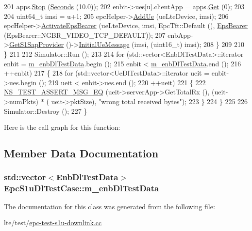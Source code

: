 \begin{DoxyCode}
201           apps.\hyperlink{classns3_1_1ApplicationContainer_adfc52f9aa4020c8714679b00bbb9ddb3}{Stop} (\hyperlink{group__timecivil_ga33c34b816f8ff6628e33d5c8e9713b9e}{Seconds} (10.0));   
202           enbit->ues[u].clientApp = apps.\hyperlink{classns3_1_1ApplicationContainer_a9e565807abd4213a56566a7ccd8d7509}{Get} (0);
203 
204           uint64\_t imsi = u+1;
205           epcHelper->\hyperlink{classns3_1_1PointToPointEpcHelper_a6ed801de21387477fabd23eeafff7e73}{AddUe} (ueLteDevice, imsi);
206           epcHelper->\hyperlink{classns3_1_1PointToPointEpcHelper_a97023077eae8644e8f1b269a357c8f93}{ActivateEpsBearer} (ueLteDevice, imsi, EpcTft::Default (), 
      \hyperlink{structns3_1_1EpsBearer}{EpsBearer} (EpsBearer::NGBR\_VIDEO\_TCP\_DEFAULT));
207           enbApp->\hyperlink{classns3_1_1EpcEnbApplication_a706b531d6ec3ab6eb37567232f5c6cd4}{GetS1SapProvider} ()->\hyperlink{classns3_1_1EpcEnbS1SapProvider_af5e1397f498eb5b2b2e84d8a41106cac}{InitialUeMessage} (imsi, (uint16\_t) 
      imsi);
208         \} 
209             
210     \} 
211   
212   Simulator::Run ();
213 
214   \textcolor{keywordflow}{for} (std::vector<EnbDlTestData>::iterator enbit = \hyperlink{classEpcS1uDlTestCase_a076410c7636f6081aeaab215a0a1bf9d}{m\_enbDlTestData}.begin ();
215        enbit < \hyperlink{classEpcS1uDlTestCase_a076410c7636f6081aeaab215a0a1bf9d}{m\_enbDlTestData}.end ();
216        ++enbit)
217     \{
218       \textcolor{keywordflow}{for} (std::vector<UeDlTestData>::iterator ueit = enbit->ues.begin ();
219            ueit < enbit->ues.end ();
220            ++ueit)
221         \{
222           \hyperlink{group__testing_ga2a9d78cffb3db8e867c35fff0b698cf5}{NS\_TEST\_ASSERT\_MSG\_EQ} (ueit->serverApp->GetTotalRx (), (ueit->numPkts) * (
      ueit->pktSize), \textcolor{stringliteral}{"wrong total received bytes"});
223         \}      
224     \}
225   
226   Simulator::Destroy ();
227 \}
\end{DoxyCode}


Here is the call graph for this function\+:




\subsection{Member Data Documentation}
\subsubsection[{\texorpdfstring{m\+\_\+enb\+Dl\+Test\+Data}{m_enbDlTestData}}]{\setlength{\rightskip}{0pt plus 5cm}std\+::vector$<${\bf Enb\+Dl\+Test\+Data}$>$ Epc\+S1u\+Dl\+Test\+Case\+::m\+\_\+enb\+Dl\+Test\+Data\hspace{0.3cm}{\ttfamily [private]}}\hypertarget{classEpcS1uDlTestCase_a076410c7636f6081aeaab215a0a1bf9d}{}\label{classEpcS1uDlTestCase_a076410c7636f6081aeaab215a0a1bf9d}


The documentation for this class was generated from the following file\+:\begin{DoxyCompactItemize}
\item 
lte/test/\hyperlink{epc-test-s1u-downlink_8cc}{epc-\/test-\/s1u-\/downlink.\+cc}\end{DoxyCompactItemize}
